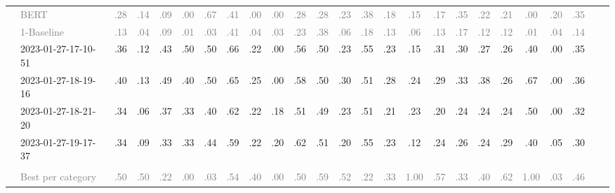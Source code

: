 \begin{table*}
\begin{tabular}{@{}ll@{\hspace{10pt}}c@{\hspace{5pt}}cccccccccccccccccccccc@{}}
& \textcolor{gray}{BERT} & \textcolor{gray}{.28} & \textcolor{gray}{.14} & \textcolor{gray}{.09} & \textcolor{gray}{.00} & \textcolor{gray}{.67} & \textcolor{gray}{.41} & \textcolor{gray}{.00} & \textcolor{gray}{.00} & \textcolor{gray}{.28} & \textcolor{gray}{.28} & \textcolor{gray}{.23} & \textcolor{gray}{.38} & \textcolor{gray}{.18} & \textcolor{gray}{.15} & \textcolor{gray}{.17} & \textcolor{gray}{.35} & \textcolor{gray}{.22} & \textcolor{gray}{.21} & \textcolor{gray}{.00} & \textcolor{gray}{.20} & \textcolor{gray}{.35} \\
& \textcolor{gray}{1-Baseline} & \textcolor{gray}{.13} & \textcolor{gray}{.04} & \textcolor{gray}{.09} & \textcolor{gray}{.01} & \textcolor{gray}{.03} & \textcolor{gray}{.41} & \textcolor{gray}{.04} & \textcolor{gray}{.03} & \textcolor{gray}{.23} & \textcolor{gray}{.38} & \textcolor{gray}{.06} & \textcolor{gray}{.18} & \textcolor{gray}{.13} & \textcolor{gray}{.06} & \textcolor{gray}{.13} & \textcolor{gray}{.17} & \textcolor{gray}{.12} & \textcolor{gray}{.12} & \textcolor{gray}{.01} & \textcolor{gray}{.04} & \textcolor{gray}{.14} \\
& 2023-01-27-17-10-51 & .36 & .12 & .43 & .50 & .50 & .66 & .22 & .00 & .56 & .50 & .23 & .55 & .23 & .15 & .31 & .30 & .27 & .26 & .40 & .00 & .35 \\
& 2023-01-27-18-19-16 & .40 & .13 & .49 & .40 & .50 & .65 & .25 & .00 & .58 & .50 & .30 & .51 & .28 & .24 & .29 & .33 & .38 & .26 & .67 & .00 & .36 \\
& 2023-01-27-18-21-20 & .34 & .06 & .37 & .33 & .40 & .62 & .22 & .18 & .51 & .49 & .23 & .51 & .21 & .23 & .20 & .24 & .24 & .24 & .50 & .00 & .32 \\
& 2023-01-27-19-17-37 & .34 & .09 & .33 & .33 & .44 & .59 & .22 & .20 & .62 & .51 & .20 & .55 & .23 & .12 & .24 & .26 & .24 & .29 & .40 & .05 & .30 \\
\addlinespace
\multicolumn{2}{@{}l}{\emph{New York Times}} \\
& \textcolor{gray}{Best per category} & \textcolor{gray}{.50} & \textcolor{gray}{.50} & \textcolor{gray}{.22} & \textcolor{gray}{.00} & \textcolor{gray}{.03} & \textcolor{gray}{.54} & \textcolor{gray}{.40} & \textcolor{gray}{.00} & \textcolor{gray}{.50} & \textcolor{gray}{.59} & \textcolor{gray}{.52} & \textcolor{gray}{.22} & \textcolor{gray}{.33} & \textcolor{gray}{1.00} & \textcolor{gray}{.57} & \textcolor{gray}{.33} & \textcolor{gray}{.40} & \textcolor{gray}{.62} & \textcolor{gray}{1.00} & \textcolor{gray}{.03} & \textcolor{gray}{.46} \\

\end{tabular}
\end{table*}
